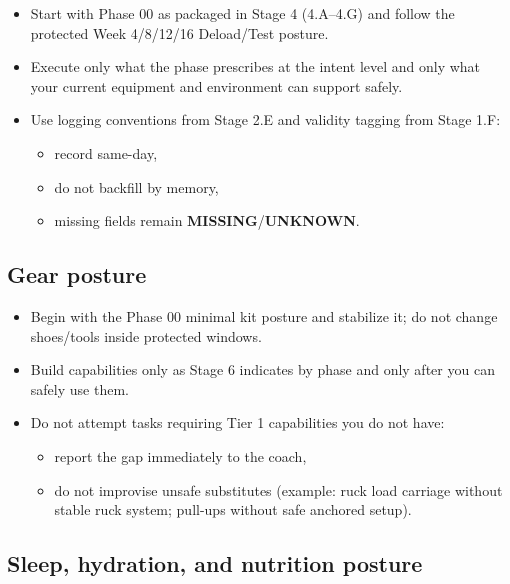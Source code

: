 \documentclass[10pt]{article}
\begin{document}
\begin{itemize}
\item Start with Phase 00 as packaged in Stage 4 (4.A–4.G) and follow the protected Week 4/8/12/16 Deload/Test posture.
\item Execute only what the phase prescribes at the intent level and only what your current equipment and environment can support safely.
\item Use logging conventions from Stage 2.E and validity tagging from Stage 1.F:
  \begin{itemize}
  \item record same-day,
  \item do not backfill by memory,
  \item missing fields remain \textbf{MISSING}/\textbf{UNKNOWN}.
  \end{itemize}
\end{itemize}

\subsection*{Gear posture}
{}

\begin{itemize}
\item Begin with the Phase 00 minimal kit posture and stabilize it; do not change shoes/tools inside protected windows.
\item Build capabilities only as Stage 6 indicates by phase and only after you can safely use them.
\item Do not attempt tasks requiring Tier 1 capabilities you do not have:
  \begin{itemize}
  \item report the gap immediately to the coach,
  \item do not improvise unsafe substitutes (example: ruck load carriage without stable ruck system; pull-ups without safe anchored setup).
  \end{itemize}
\end{itemize}

\subsection*{Sleep, hydration, and nutrition posture}
{}
\end{document}

